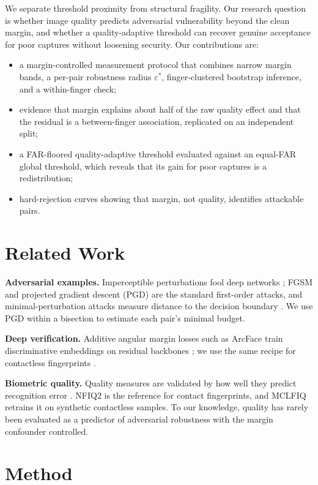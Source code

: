 \documentclass[10pt,twocolumn,letterpaper]{article}
\newcommand{\eps}{\varepsilon}
\begin{document}
We separate threshold proximity from structural fragility. Our research question is whether image quality predicts adversarial vulnerability beyond the clean margin, and whether a quality-adaptive threshold can recover genuine acceptance for poor captures without loosening security. Our contributions are:
\begin{itemize}
\item a margin-controlled measurement protocol that combines narrow margin bands, a per-pair robustness radius $\eps^*$, finger-clustered bootstrap inference, and a within-finger check;
\item evidence that margin explains about half of the raw quality effect and that the residual is a between-finger association, replicated on an independent split;
\item a FAR-floored quality-adaptive threshold evaluated against an equal-FAR global threshold, which reveals that its gain for poor captures is a redistribution;
\item hard-rejection curves showing that margin, not quality, identifies attackable pairs.
\end{itemize}

\section{Related Work}
\textbf{Adversarial examples.} Imperceptible perturbations fool deep networks \cite{szegedy2014}; FGSM \cite{goodfellow2015} and projected gradient descent (PGD) \cite{madry2018} are the standard first-order attacks, and minimal-perturbation attacks measure distance to the decision boundary \cite{carlini2017}. We use PGD within a bisection to estimate each pair's minimal budget.

\textbf{Deep verification.} Additive angular margin losses such as ArcFace \cite{deng2019} train discriminative embeddings on residual backbones \cite{he2016}; we use the same recipe for contactless fingerprints \cite{polyu}.

\textbf{Biometric quality.} Quality measures are validated by how well they predict recognition error \cite{grother2007}. NFIQ2 \cite{nfiq2} is the reference for contact fingerprints, and MCLFIQ \cite{mclfiq} retrains it on synthetic contactless samples. To our knowledge, quality has rarely been evaluated as a predictor of adversarial robustness with the margin confounder controlled.

\section{Method}
\end{document}
